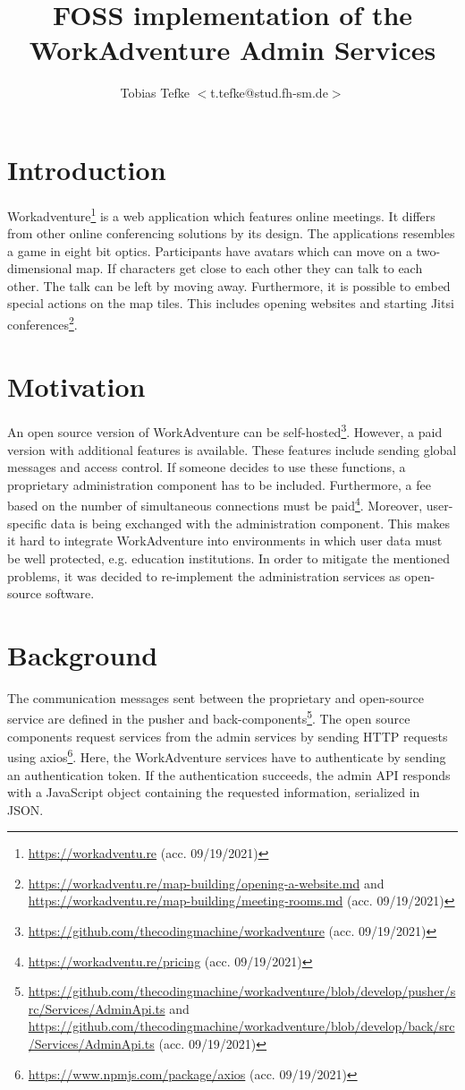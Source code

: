 \documentclass[a4paper]{scrartcl}
\title{FOSS implementation of the WorkAdventure Admin Services}
\author{Tobias Tefke $<$t.tefke@stud.fh-sm.de$>$}
\begin{document}
	\maketitle
	\section{Introduction}
	\enlargethispage{\baselineskip}
	\enlargethispage{\baselineskip}
	Workadventure\footnote{\url{https://workadventu.re} (acc. 09/19/2021)} is a web application which features online meetings.
	It differs from other online conferencing solutions by its design.
	The applications resembles a game in eight bit optics.
	Participants have avatars which can move on a two-dimensional map. 
	If characters get close to each other they can talk to each other.
	The talk can be left by moving away.
	Furthermore, it is possible to embed special actions on the map tiles.
	This includes opening websites and starting Jitsi conferences\footnote{\url{https://workadventu.re/map-building/opening-a-website.md} and \url{https://workadventu.re/map-building/meeting-rooms.md} (acc. 09/19/2021)}.
	\section{Motivation}
	An open source version of WorkAdventure can be self-hosted\footnote{\url{https://github.com/thecodingmachine/workadventure} (acc. 09/19/2021)}.
	However, a paid version with additional features is available.
	These features include sending global messages and access control.
	If someone decides to use these functions, a proprietary administration component has to be included.
	Furthermore, a fee based on the number of simultaneous connections must be paid\footnote{\url{https://workadventu.re/pricing} (acc. 09/19/2021)}.
	Moreover, user-specific data is being exchanged with the administration component.
	This makes it hard to integrate WorkAdventure into environments in which user data must be well protected, e.g. education institutions.
	In order to mitigate the mentioned problems, it was decided to re-implement the administration services as open-source software.
	\section{Background}
	\enlargethispage{\baselineskip}
	\enlargethispage{\baselineskip}
	The communication messages sent between the proprietary and open-source service are defined in the pusher and back-components\footnote{\label{communication-messages}\url{https://github.com/thecodingmachine/workadventure/blob/develop/pusher/src/Services/AdminApi.ts} and \url{https://github.com/thecodingmachine/workadventure/blob/develop/back/src/Services/AdminApi.ts} (acc. 09/19/2021)}.
	The open source components request services from the admin services by sending HTTP requests using axios\footnote{\url{https://www.npmjs.com/package/axios} (acc. 09/19/2021)}. Here, the WorkAdventure services have to authenticate by sending an authentication token.
	If the authentication succeeds, the admin API responds with a JavaScript object containing the requested information, serialized in JSON.
\end{document}
